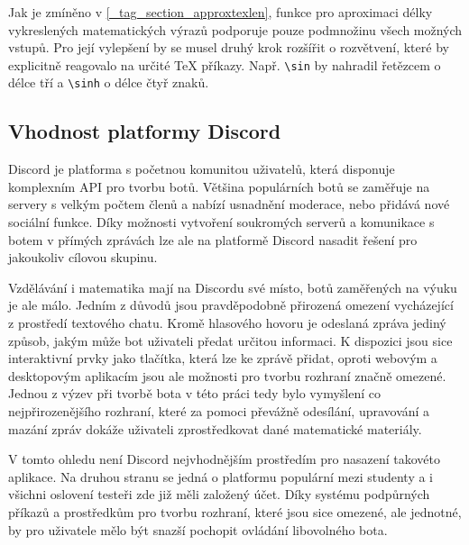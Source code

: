 \documentclass[FM]{tulthesis}
\begin{document}
	Jak je zmíněno v \ref{_tag_section_approxtexlen}, funkce pro aproximaci délky vykreslených matematických výrazů podporuje pouze podmnožinu všech možných vstupů. Pro její vylepšení by se musel druhý krok rozšířit o rozvětvení, které by explicitně reagovalo na určité TeX příkazy. Např. \verb|\sin| by nahradil řetězcem o délce tří a \verb|\sinh| o délce čtyř znaků. 
	
		
	\subsection{Vhodnost platformy Discord}
	
	Discord je platforma s početnou komunitou uživatelů, která disponuje komplexním API pro tvorbu botů. Většina populárních botů se zaměřuje na servery s velkým počtem členů a nabízí usnadnění moderace, nebo přidává nové sociální funkce. Díky možnosti vytvoření soukromých serverů a komunikace s botem v přímých zprávách lze ale na platformě Discord nasadit řešení pro jakoukoliv cílovou skupinu.
	
	Vzdělávání i matematika mají na Discordu své místo, botů zaměřených na výuku je ale málo. Jedním z důvodů jsou pravděpodobně přirozená omezení vycházející z prostředí textového chatu. Kromě hlasového hovoru je odeslaná zpráva jediný způsob, jakým může bot uživateli předat určitou informaci. K dispozici jsou sice interaktivní prvky jako tlačítka, která lze ke zprávě přidat, oproti webovým a desktopovým aplikacím jsou ale možnosti pro tvorbu rozhraní značně omezené. Jednou z výzev při tvorbě bota v této práci tedy bylo vymyšlení co nejpřirozenějšího rozhraní, které za pomoci převážně odesílání, upravování a mazání zpráv dokáže uživateli zprostředkovat dané matematické materiály.
	
	V tomto ohledu není Discord nejvhodnějším prostředím pro nasazení takovéto aplikace. Na druhou stranu se jedná o platformu populární mezi studenty a i všichni oslovení testeři zde již měli založený účet. Díky systému podpůrných příkazů a prostředkům pro tvorbu rozhraní, které jsou sice omezené, ale jednotné, by pro uživatele mělo být snazší pochopit ovládání libovolného bota.
	
\end{document}
